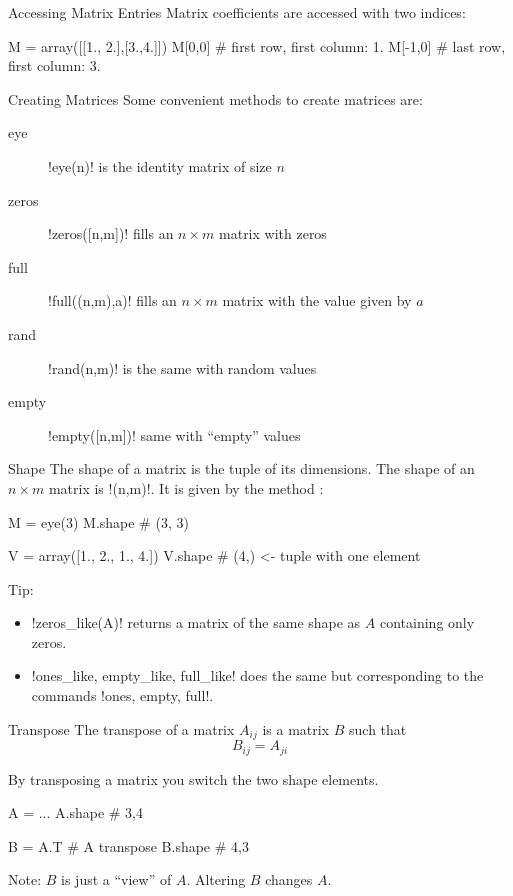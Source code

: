 \documentclass[hyperref={pdfpagelabels=false},table]{beamer}
\begin{document}
\begin{frame}[fragile]{Accessing Matrix Entries}
Matrix coefficients are accessed with \alert{two} indices:
\begin{python}
M = array([[1., 2.],[3.,4.]])
M[0,0] # first row, first column: 1.
M[-1,0] # last row, first column: 3.
\end{python}
\end{frame}

\begin{frame}[fragile]{Creating Matrices}
Some convenient methods to create matrices are:
\begin{description}
\item[eye] \pyth!eye(n)! is the identity matrix of size $n$
\item[zeros] \pyth!zeros([n,m])! fills an $n\times m$ matrix with zeros
\item[full] \pyth!full((n,m),a)! fills an $n\times m$ matrix with the value given by $a$
\item[rand] \pyth!rand(n,m)! is the same with random values
\item[empty] \pyth!empty([n,m])! same with ``empty'' values
\end{description}
\end{frame}

\begin{frame}[fragile]{Shape}
The \alert{shape} of a matrix is the tuple of its dimensions. The shape of an $n\times m$ matrix is \pyth!(n,m)!. It is given by the method :
\begin{python}
M = eye(3)
M.shape # (3, 3)

V = array([1., 2., 1., 4.])
V.shape # (4,) <- tuple with one element
\end{python}
\vfill
Tip:
\begin{itemize}
\item[] \pyth!zeros_like(A)! returns a matrix of the same shape as $A$ containing only zeros.
\item[] \pyth!ones_like, empty_like, full_like! does the same but corresponding to the commands \pyth!ones, empty, full!.
\end{itemize}
\vfill


\end{frame}

\begin{frame}[fragile]{Transpose}
The \alert{transpose} of a matrix $A_{ij}$ is a matrix $B$ such that
\[B_{ij} = A_{ji}\]

By transposing a matrix you \alert{switch} the two shape elements.

\begin{python}
A = ...
A.shape # 3,4

B = A.T # A transpose
B.shape # 4,3
\end{python}
\vfill
Note: $B$ is just a ``view'' of $A$. Altering $B$ changes $A$.
\end{frame}
\end{document}
